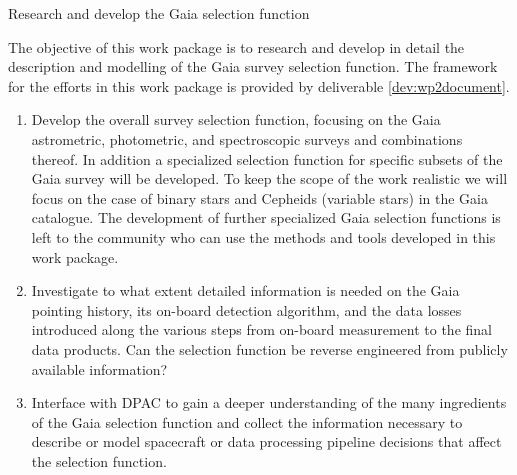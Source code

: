 \begin{workpackage}{Research and develop the Gaia selection function}
  \label{wp:selfungaia}
  \wpend{\duration} %
  
  \makewptable %

  \begin{wpobjectives}
    The objective of this work package is to research and develop in detail the description and modelling of the Gaia survey selection function. The framework for the efforts in this work package is provided by deliverable \ref{dev:wp2document}.
    \begin{enumerate}
      \item Develop the overall survey selection function, focusing on the Gaia astrometric, photometric, and spectroscopic surveys and combinations thereof. In addition a specialized selection function for specific subsets of the Gaia survey will be developed. To keep the scope of the work realistic we will focus on the case of binary stars and Cepheids (variable stars) in the Gaia catalogue. The development of further specialized Gaia selection functions is left to the community who can use the methods and tools developed in this work package. 
      \item Investigate to what extent detailed information is needed on the Gaia pointing history, its on-board detection algorithm, and the data losses introduced along the various steps from on-board measurement to the final data products. Can the selection function be reverse engineered from publicly available information?
      \item Interface with DPAC to gain a deeper understanding of the many ingredients of the Gaia selection function and collect the information necessary to describe or model spacecraft or data processing pipeline decisions that affect the selection function.
    \end{enumerate}
  \end{wpobjectives}

  \begin{wpdescription}


\end{wpdescription}
\end{workpackage}
